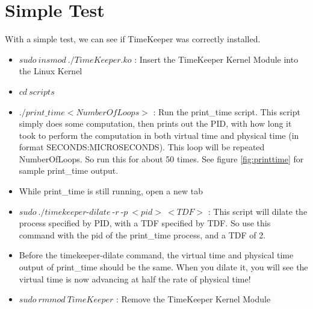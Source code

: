 \section{Simple Test}
With a simple test, we can see if TimeKeeper was correctly installed. 
\begin{itemize}
\item $sudo\ insmod\ ./TimeKeeper.ko$ : Insert the TimeKeeper Kernel Module into the Linux Kernel
\item $cd\ scripts$
\item $./print\_time <NumberOfLoops>$ : Run the print\_time script. This script simply does some computation, then prints out the PID, with how long it took to perform the computation in both virtual time and physical time (in format SECONDS:MICROSECONDS). This loop will be repeated NumberOfLoops. So run this for about 50 times. See figure \ref{fig:printtime} for sample print\_time output.
\item While print\_time is still running, open a new tab
\item $sudo\ ./timekeeper$-$dilate\ $-$r\ $-$p\ <pid>\ <TDF>$ : This script will dilate the process specified by PID, with a TDF specified by TDF. So use this command with the pid of the print\_time process, and a TDF of 2. 
\item Before the timekeeper-dilate command, the virtual time and physical time output of print\_time should be the same. When you dilate it, you will see the virtual time is now advancing at half the rate of physical time!
\item $sudo\ rmmod\ TimeKeeper$ : Remove the TimeKeeper Kernel Module
\end{itemize}
